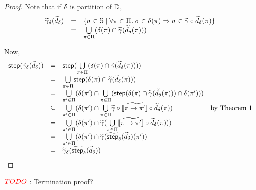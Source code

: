 \begin{proof}
Note that if $\delta$ is partition of $\mathbb{D}$,
\[
  \begin{array}{rcl}
    \widetilde{\gamma}_\delta(\widetilde{d}_\delta)
    &=& \{ \sigma \in \mathbb{S} \mid \forall \pi \in \Pi. \;
    \sigma \in \delta(\pi) \Rightarrow \sigma \in \widetilde{\gamma} \circ \widetilde{d}_\delta(\pi) \}\\
    &=& \underset{\pi \in \Pi}{\bigcup}
      {(\delta(\pi) \cap \widetilde{\gamma}(\widetilde{d}_\delta(\pi)))}
  \end{array}
\]

Now,
\[
  \begin{array}{rclr}
    \textsf{step}(\widetilde{\gamma}_\delta(\widetilde{d}_\delta))
    &=& \textsf{step}(\underset{\pi \in \Pi}{\bigcup}
      {(\delta(\pi) \cap \widetilde{\gamma}(\widetilde{d}_\delta(\pi)))})\\
    &=& \underset{\pi \in \Pi}{\bigcup}
      {\textsf{step}(\delta(\pi) \cap \widetilde{\gamma}(\widetilde{d}_\delta(\pi)))}\\
    &=& \underset{\pi' \in \Pi}{\bigcup}
      {(\delta(\pi') \cap
      \underset{\pi \in \Pi}{\bigcup}
        {(\textsf{step}(\delta(\pi) \cap \widetilde{\gamma}(\widetilde{d}_\delta(\pi))) \cap \delta(\pi'))})}\\
    &\subseteq& \underset{\pi' \in \Pi}{\bigcup}
      {(\delta(\pi') \cap \underset{\pi \in \Pi}{\bigcup}
        {\widetilde{\gamma} \circ [\![{\widetilde{\pi \rightarrow \pi'}}]\!] \circ \widetilde{d}_\delta(\pi)})} & \text{by Theorem 1}\\
    &=& \underset{\pi' \in \Pi}{\bigcup}{(\delta(\pi') \cap
      \widetilde{\gamma}(\underset{\pi \in \Pi}{\bigcup}{[\![{\widetilde{\pi \rightarrow \pi'}}]\!] \circ \widetilde{d}_\delta(\pi)}))} \\
    &=& \underset{\pi' \in \Pi}{\bigcup}{(\delta(\pi') \cap
      \widetilde{\gamma}(\widetilde{\textsf{step}}_\delta(\widetilde{d}_\delta)(\pi'))}\\
    &=& \widetilde{\gamma}_\delta(\widetilde{\textsf{step}}_\delta(\widetilde{d}_\delta)) 
 
  \end{array}
\]
\end{proof}

${\color{red}{TODO}}$ : Termination proof?

